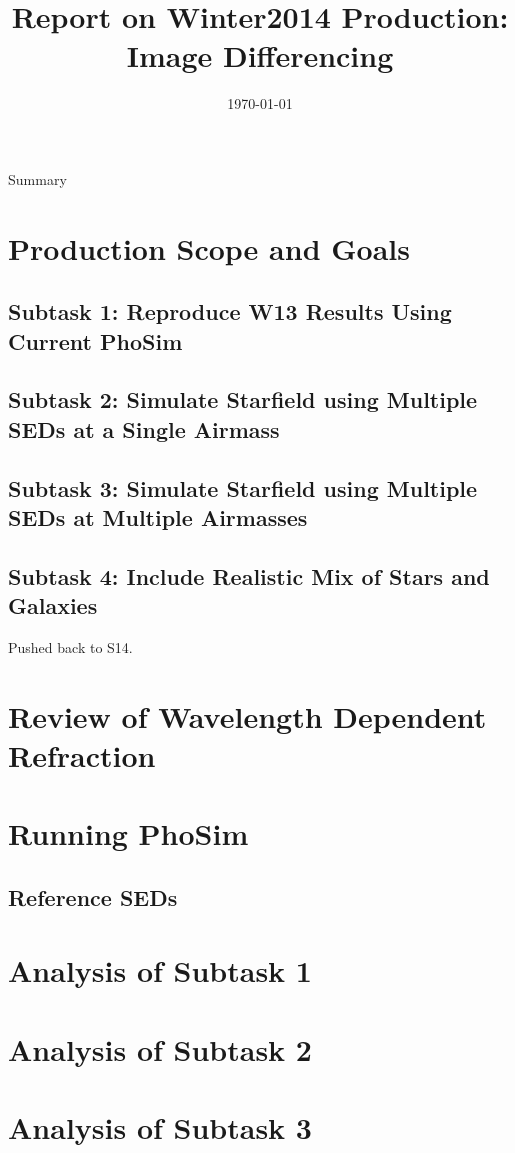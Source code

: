 \documentclass[prd, nofootinbib, floatfix, 11pt, tightenlines, times]{article}
\title{\vspace{-22mm} \Large{Report on Winter2014 Production: Image Differencing} \vspace{-6mm}}
\date{\today}
\begin{document}
\maketitle
Summary

\clearpage
\tableofcontents
\clearpage

\section{Production Scope and Goals}
\subsection{Subtask 1: Reproduce W13 Results Using Current PhoSim}
\subsection{Subtask 2: Simulate Starfield using Multiple SEDs at a Single Airmass}
\subsection{Subtask 3: Simulate Starfield using Multiple SEDs at Multiple Airmasses}
\subsection{Subtask 4: Include Realistic Mix of Stars and Galaxies}
Pushed back to S14.
\section{Review of Wavelength Dependent Refraction \label{sec:theory}}
\section{Running PhoSim}
\subsection{Reference SEDs \label{sec:seds}}
\section{Analysis of Subtask 1}
\section{Analysis of Subtask 2}
\section{Analysis of Subtask 3}
\end{document}
